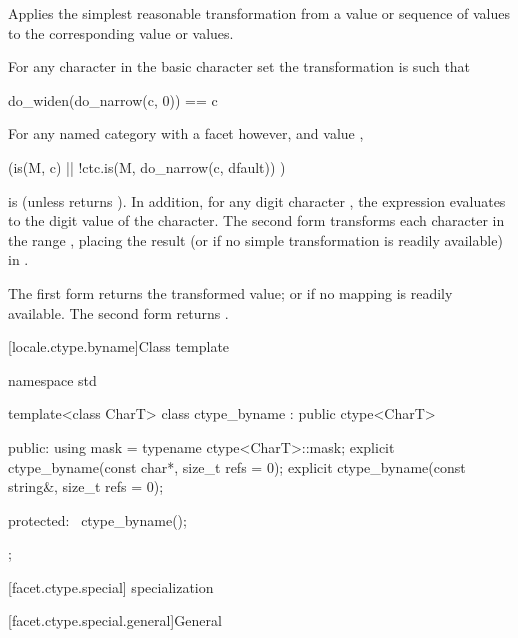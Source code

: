 \begin{itemdescr}
\pnum
\effects
Applies the simplest reasonable transformation
from a  value or sequence of  values
to the corresponding  value or values.

For any character  in the basic character set
the transformation is such that
\begin{codeblock}
do_widen(do_narrow(c, 0)) == c
\end{codeblock}

For any named  category with
a  facet  however, and
 value ,
\begin{codeblock}
(is(M, c) || !ctc.is(M, do_narrow(c, dfault)) )
\end{codeblock}
is  (unless  returns ).
In addition, for any digit character ,
the expression 
evaluates to the digit value of the character.
The second form transforms
each character  in the range ,
placing the result
(or  if no simple transformation is readily available)
in .

\pnum
\returns
The first form returns the transformed value;
or  if no mapping is readily available.
The second form returns .
\end{itemdescr}

[locale.ctype.byname]{Class template }

%
\begin{codeblock}
namespace std {
  template<class CharT>
    class ctype_byname : public ctype<CharT> {
    public:
      using mask = typename ctype<CharT>::mask;
      explicit ctype_byname(const char*, size_t refs = 0);
      explicit ctype_byname(const string&, size_t refs = 0);

    protected:
      ~ctype_byname();
    };
}
\end{codeblock}

[facet.ctype.special]{ specialization}

[facet.ctype.special.general]{General}

